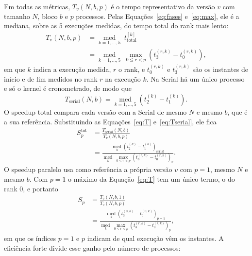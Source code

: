 \documentclass[Portugues]{ic-tese-v3}
\DeclareRobustCommand{\_}{\textunderscore\allowbreak} %
\begin{document}
Em todas as métricas, $T_v(N,b,p)$ é o tempo representativo da versão $v$ com tamanho $N$, bloco $b$ e $p$ processos. Pelas Equações~\eqref{eq:fases} e~\eqref{eq:max}, ele é a mediana, sobre as 5 execuções medidas, do tempo total do rank mais lento:
\begin{equation}\label{eq:T}
\begin{split}
T_v(N,b,p) &= \operatorname*{med}_{k=1,\dots,5} \; t_{\mathrm{total}}^{[k]} \\
&= \operatorname*{med}_{k=1,\dots,5} \; \max_{0 \le r < p} \left( t_3^{(r,k)} - t_0^{(r,k)} \right),
\end{split}
\end{equation}
em que $k$ indica a execução medida, $r$ o rank, e $t_0^{(r,k)}$ e $t_3^{(r,k)}$ são os instantes de início e de fim medidos no rank $r$ na execução $k$. Na Serial há um único processo e só o kernel é cronometrado, de modo que
\begin{equation}\label{eq:Tserial}
T_{\mathrm{serial}}(N,b) = \operatorname*{med}_{k=1,\dots,5} \left( t_2^{(k)} - t_1^{(k)} \right).
\end{equation}
O speedup total compara cada versão com a Serial de mesmo $N$ e mesmo $b$, que é a sua referência. Substituindo as Equações~\eqref{eq:T} e~\eqref{eq:Tserial}, ele fica
\begin{equation}\label{eq:stot}
\begin{split}
S^{\mathrm{tot}}_p &= \frac{T_{\mathrm{serial}}(N,b)}{T_v(N,b,p)} \\[4pt]
&= \frac{\operatorname*{med}_{k} \left( t_2^{(k)} - t_1^{(k)} \right)_{\mathrm{serial}}}
        {\operatorname*{med}_{k} \; \max_{0 \le r < p} \left( t_3^{(r,k)} - t_0^{(r,k)} \right)_{v}}.
\end{split}
\end{equation}
O speedup paralelo usa como referência a própria versão $v$ com $p=1$, mesmo $N$ e mesmo $b$. Com $p=1$ o máximo da Equação~\eqref{eq:T} tem um único termo, o do rank 0, e portanto
\begin{equation}\label{eq:sp}
\begin{split}
S_p &= \frac{T_v(N,b,1)}{T_v(N,b,p)} \\[4pt]
&= \frac{\operatorname*{med}_{k} \left( t_3^{(0,k)} - t_0^{(0,k)} \right)_{p=1}}
        {\operatorname*{med}_{k} \; \max_{0 \le r < p} \left( t_3^{(r,k)} - t_0^{(r,k)} \right)_{p}},
\end{split}
\end{equation}
em que os índices $p=1$ e $p$ indicam de qual execução vêm os instantes. A eficiência forte divide esse ganho pelo número de processos:
\end{document}

